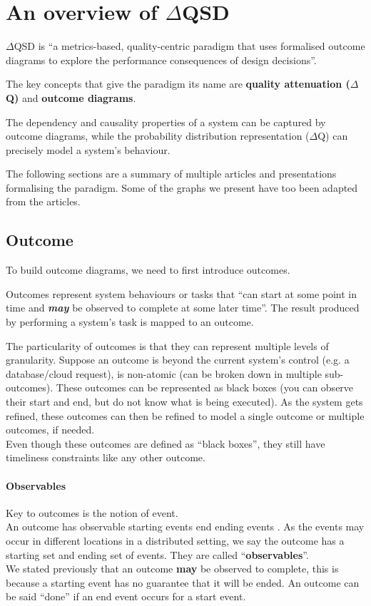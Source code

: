 \section{An overview of $\Delta$QSD}
    $\Delta$QSD is ``a metrics-based, quality-centric paradigm that uses formalised outcome diagrams to explore the performance consequences of design decisions''. \cite{myo}
    
    The key concepts that give the paradigm its name are \textbf{quality attenuation ($\Delta$Q)} and \textbf{outcome diagrams}. \cite{dq-tut}

    The dependency and causality properties of a system can be captured by outcome diagrams, while the probability distribution representation ($\Delta$Q) can precisely model a system's behaviour. \cite{myo}
 
    The following sections are a summary of multiple articles and presentations formalising the paradigm. Some of the graphs we present have too been adapted from the articles.
     
 \subsection{Outcome}
    To build outcome diagrams, we need to first introduce outcomes. 

        Outcomes represent system behaviours or tasks that ``can start at some point in time and \textit{\textbf{may}} be observed to complete at some later time''. \cite{dq-br}
        The result produced by performing a system's task is mapped to an outcome. \cite{myo} 
     
        The particularity of outcomes is that they can represent multiple levels of granularity. Suppose an outcome is beyond the current system's control (e.g. a database/cloud request), is non-atomic (can be broken down in multiple sub-outcomes). These outcomes can be represented as black boxes (you can observe their start and end, but do not know what is being executed). As the system gets refined, these outcomes can then be refined to model a single outcome or multiple outcomes, if needed. \cite{myo} \\ 
        Even though these outcomes are defined as ``black boxes'', they still have timeliness constraints like any other outcome. 

     \paragraph{Observables}
     Key to outcomes is the notion of event. \\
     An outcome has observable starting events end ending events \cite{dq-tut}. As the events may occur in different locations in a distributed setting, we say the outcome has a starting set and ending set of events. They are called ``\textbf{observables}''. \cite{myo}\\
     We stated previously that an outcome \textbf{may} be observed to complete, this is because a starting event has no guarantee that it will be ended. An outcome can be said ``done'' if an end event occurs for a start event.

